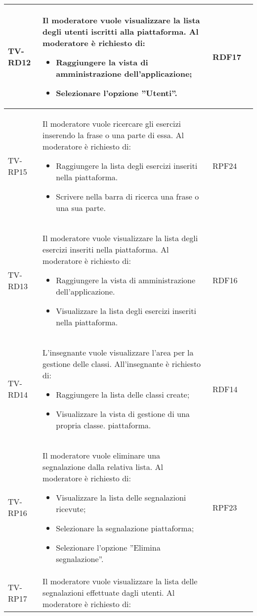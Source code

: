 \begin{longtable}{|>{\centering\arraybackslash}m{1.6cm}|>{\centering\arraybackslash}m{6.41cm}|>{\centering\arraybackslash}m{3.1cm} | >{\centering\arraybackslash}m{2.6cm}|}
		  \rowcolor{LightGray}
TV-RD12 & Il moderatore vuole visualizzare la lista degli utenti iscritti alla piattaforma. Al moderatore è richiesto di:
\begin{itemize}
 \item Raggiungere la vista di amministrazione dell’applicazione;
 \item Selezionare l’opzione ”Utenti”.
\end{itemize}  & RDF17 \\ \hline

TV-RP15 & Il moderatore vuole ricercare gli esercizi inserendo la frase o una parte di essa. Al moderatore è richiesto di:

\begin{itemize}
 \item Raggiungere la lista degli esercizi inseriti nella piattaforma.
 \item Scrivere nella barra di ricerca una frase o una sua parte.
\end{itemize}  & RPF24 \\ \hline

		  \rowcolor{LightGray}
TV-RD13 & Il moderatore vuole visualizzare la lista degli esercizi inseriti nella piattaforma. Al moderatore è richiesto di:

\begin{itemize}
 \item Raggiungere la vista di amministrazione dell’applicazione.
 \item Visualizzare la lista degli esercizi inseriti nella piattaforma.
\end{itemize}  & RDF16 \\ \hline

TV-RD14 & L’insegnante vuole visualizzare l’area per la gestione delle classi. All'insegnante è richiesto di:

\begin{itemize}
 \item Raggiungere la lista delle classi create;
 \item Visualizzare la vista di gestione di una propria classe. piattaforma.
\end{itemize}  & RDF14 \\ \hline

		  \rowcolor{LightGray}
TV-RP16 & Il moderatore vuole eliminare una segnalazione dalla relativa lista. Al moderatore è richiesto di:

\begin{itemize}
 \item Visualizzare la lista delle segnalazioni ricevute;
 \item Selezionare la segnalazione piattaforma;
 \item Selezionare l’opzione ”Elimina segnalazione”.
\end{itemize}  & RPF23 \\ \hline
TV-RP17 & Il moderatore vuole visualizzare la lista delle segnalazioni effettuate dagli utenti. Al moderatore è richiesto di:


\end{longtable}
